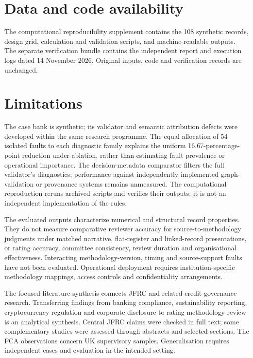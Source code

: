 \documentclass[11pt,a4paper]{article}
\begin{document}
\section*{Data and code availability}

The computational reproducibility supplement contains the 108 synthetic records, design grid, calculation and validation scripts, and machine-readable outputs. The separate verification bundle contains the independent report and execution logs dated 14 November 2026. Original inputs, code and verification records are unchanged.

\section{Limitations}

The case bank is synthetic; its validator and semantic attribution defects were developed within the same research programme. The equal allocation of 54 isolated faults to each diagnostic family explains the uniform 16.67-percentage-point reduction under ablation, rather than estimating fault prevalence or operational importance. The decision-metadata comparator filters the full validator's diagnostics; performance against independently implemented graph-validation or provenance systems remains unmeasured. The computational reproduction reruns archived scripts and verifies their outputs; it is not an independent implementation of the rules.

The evaluated outputs characterize numerical and structural record properties. They do not measure comparative reviewer accuracy for source-to-methodology judgments under matched narrative, flat-register and linked-record presentations, or rating accuracy, committee consistency, review duration and organisational effectiveness. Interacting methodology-version, timing and source-support faults have not been evaluated. Operational deployment requires institution-specific methodology mappings, access controls and confidentiality arrangements.

The focused literature synthesis connects JFRC and related credit-governance research. Transferring findings from banking compliance, sustainability reporting, cryptocurrency regulation and corporate disclosure to rating-methodology review is an analytical synthesis. Central JFRC claims were checked in full text; some complementary studies were assessed through abstracts and selected sections. The FCA observations concern UK supervisory samples. Generalisation requires independent cases and evaluation in the intended setting.

\begingroup
{}
\setlength{\bibsep}{5pt}


\endgroup
\end{document}
